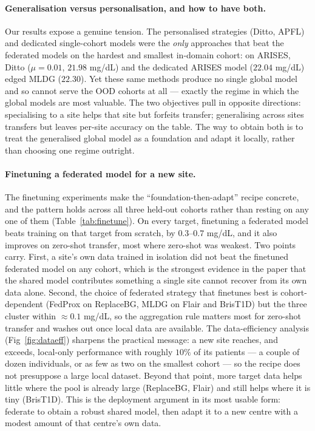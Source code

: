 \documentclass[10pt,letterpaper]{article}
\begin{document}
\paragraph{Generalisation versus personalisation, and how to have both.} Our
results expose a genuine tension. The personalised strategies (Ditto, APFL) and
dedicated single-cohort models were the \emph{only} approaches that beat the
federated models on the hardest and smallest in-domain cohort: on ARISES, Ditto
($\mu{=}0.01$, $21.98$ mg/dL) and the dedicated ARISES model ($22.04$ mg/dL) edged
MLDG ($22.30$). Yet these same methods produce no single global model and so
cannot serve the OOD cohorts at all --- exactly the regime in which the global
models are most valuable. The two objectives pull in opposite directions:
specialising to a site helps that site but forfeits transfer; generalising across
sites transfers but leaves per-site accuracy on the table. The way to obtain both
is to treat the generalised global model as a foundation and adapt it locally,
rather than choosing one regime outright.

\paragraph{Finetuning a federated model for a new site.} The finetuning
experiments make the ``foundation-then-adapt'' recipe concrete, and the pattern
holds across all three held-out cohorts rather than resting on any one of them
(Table~\ref{tab:finetune}). On every target, finetuning a federated model
beats training on that target from scratch, by $0.3$--$0.7$ mg/dL, and it also
improves on zero-shot transfer, most where zero-shot was weakest. Two points
carry. First, a site's own data trained in isolation did not beat the finetuned
federated model on any cohort, which is the strongest evidence in the paper that
the shared model contributes something a single site cannot recover from its own
data alone. Second, the choice of federated strategy that finetunes best is
cohort-dependent (FedProx on ReplaceBG, MLDG on Flair and BrisT1D) but the three
cluster within $\approx 0.1$ mg/dL, so the aggregation rule matters most for
zero-shot transfer and washes out once local data are available. The
data-efficiency analysis (Fig~\ref{fig:dataeff}) sharpens the practical message: a
new site reaches, and exceeds, local-only performance with roughly $10\%$ of its
patients --- a couple of dozen individuals, or as few as two on the smallest
cohort --- so the recipe does not presuppose a large local dataset. Beyond that
point, more target data helps little where the pool is already large (ReplaceBG,
Flair) and still helps where it is tiny (BrisT1D). This is the deployment argument
in its most usable form: federate to obtain a robust shared model, then adapt it
to a new centre with a modest amount of that centre's own data.
\end{document}

